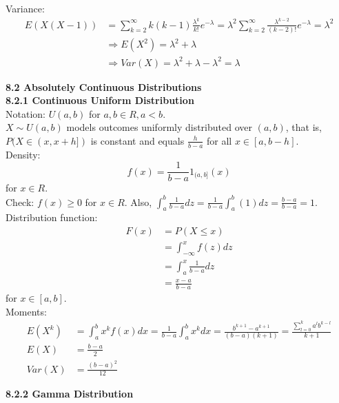 \documentclass[10pt,letterpaper]{article}
\begin{document}
    Variance:
					\begin{align*}
						E(X(X-1))&=\sum_{k=2}^{\infty}k(k-1)\frac{\lambda^k}{k!}e^{-\lambda}
						=\lambda^2\sum_{k=2}^{\infty}\frac{\lambda^{k-2}}{(k-2)!}e^{-\lambda}
						=\lambda^2\\
						&\Rightarrow E(X^2)=\lambda^2+\lambda\\
						&\Rightarrow Var(X)=\lambda^2+\lambda-\lambda^2=\lambda
					\end{align*}

\pagebreak

\textbf{8.2 Absolutely Continuous Distributions}\\

\textbf{8.2.1 Continuous Uniform Distribution}\\

      Notation: $U(a, b)$ for $a, b\in R, a<b$.\\
      
			$X\sim U(a, b)$ models outcomes uniformly distributed over $(a, b)$, that is, $P(X\in(x, x+h])$ is constant and equals $\frac{h}{b-a}$ for all $x\in[a, b-h]$.\\
			
			Density: \[f(x)=\frac{1}{b-a}1_{(a, b]}(x)\] for $x\in R$.\\
			
			Check: $f(x)\geq 0$ for $x\in R$. Also, $\int_a^b\frac{1}{b-a}dz=\frac{1}{b-a}\int_a^b(1)dz=\frac{b-a}{b-a}=1$.\\
			
			Distribution function:
					\begin{align*}
						F(x)&=P(X\leq x)\\
						&=\int_{-\infty}^xf(z)dz\\
						&=\int_a^x\frac{1}{b-a}dz\\
						&=\frac{x-a}{b-a}
					\end{align*}
					for $x\in[a, b]$.\\
					
			Moments:
					\begin{align*}
						E(X^k)&=\int_a^bx^kf(x)dx
						=\frac{1}{b-a}\int_a^bx^kdx
						=\frac{b^{k+1}-a^{k+1}}{(b-a)(k+1)}
						=\frac{\sum_{l=0}^{k}a^lb^{k-l}}{k+1}\\
						E(X)&=\frac{b-a}{2}\\
						Var(X)&=\frac{(b-a)^2}{12}
					\end{align*}

\pagebreak

\textbf{8.2.2 Gamma Distribution}\\
\end{document}
